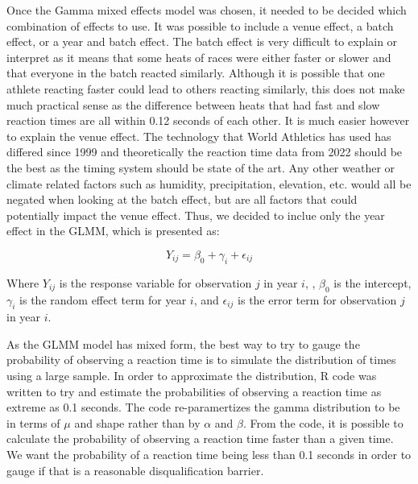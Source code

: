\documentclass[12pt, letterpaper, titlepage]{article}
\begin{document}
Once the Gamma mixed effects model was chosen, it needed to be decided which combination
of effects to use.  It was possible to include a venue effect, a batch effect, 
or a year and batch effect.  The batch effect is very
difficult to explain or interpret as it means that some heats of races were either
faster or slower and that everyone in the batch reacted similarly.  Although
it is possible that one athlete reacting faster could lead to others reacting
similarly, this does not make much practical sense as the difference between
heats that had fast and slow reaction times are all within 0.12 seconds of each
other.  It is much easier however to explain the venue effect.  The technology
that World Athletics has used has differed since 1999 and theoretically the
reaction time data from 2022 should be the best as the timing system should be
state of the art.  Any other weather or climate related factors such as humidity,
precipitation, elevation, etc. would all be negated when looking at the batch
effect, but are all factors that could potentially impact the venue effect.
Thus, we decided to inclue only the year effect in the GLMM, which is presented
as:

\begin{equation}
  \label{eq:GLMM}
  Y_{ij} = \beta_0 + \gamma_i + \epsilon_{ij}
\end{equation}
  
Where $Y_{ij}$ is the response variable for observation $j$ in year $i$, , 
$\beta_0$ is the intercept, $\gamma_i$ is the random effect term for year $i$, 
and $\epsilon_{ij}$ is the error term for observation $j$ in year $i$.


As the GLMM model has mixed form, the best way to try to gauge the probability
of observing a reaction time is to simulate the distribution of times using a 
large sample.  In order to approximate the distribution, R code was written to 
try and estimate the probabilities of observing a reaction time as extreme as
0.1 seconds.  The code re-paramertizes the gamma distribution to be in terms of
$\mu$ and shape rather than by $\alpha$ and $\beta$.  From the code, it is
possible to calculate the probability of observing a reaction time faster than
a given time.  We want the probability of a reaction time being less than 0.1
seconds in order to gauge if that is a reasonable disqualification barrier.
\end{document}
